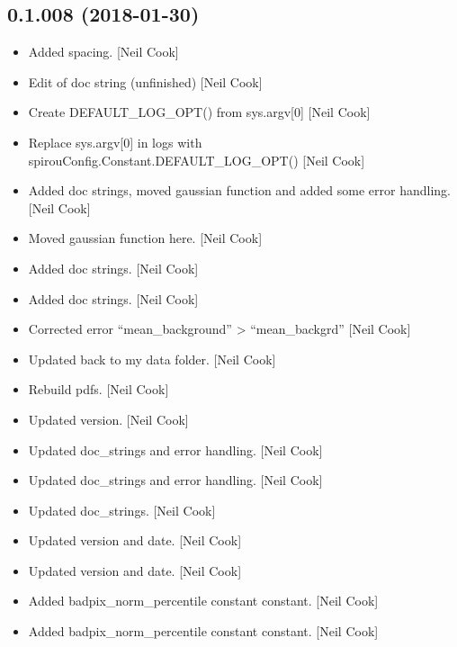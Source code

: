 \documentclass[a4paper,10pt,english]{report}
\begin{document}
\subsection{0.1.008 (2018-01-30)}
\label{\detokenize{misc/changelog:id494}}\begin{itemize}
\item {} 
Added spacing. {[}Neil Cook{]}

\item {} 
Edit of doc string (unfinished) {[}Neil Cook{]}

\item {} 
Create DEFAULT\_LOG\_OPT() from sys.argv{[}0{]} {[}Neil Cook{]}

\item {} 
Replace sys.argv{[}0{]} in logs with
spirouConfig.Constant.DEFAULT\_LOG\_OPT() {[}Neil Cook{]}

\item {} 
Added doc strings, moved gaussian function and added some error
handling. {[}Neil Cook{]}

\item {} 
Moved gaussian function here. {[}Neil Cook{]}

\item {} 
Added doc strings. {[}Neil Cook{]}

\item {} 
Added doc strings. {[}Neil Cook{]}

\item {} 
Corrected error “mean\_background” \textendash{}\textgreater{} “mean\_backgrd” {[}Neil Cook{]}

\item {} 
Updated back to my data folder. {[}Neil Cook{]}

\item {} 
Rebuild pdfs. {[}Neil Cook{]}

\item {} 
Updated version. {[}Neil Cook{]}

\item {} 
Updated doc\_strings and error handling. {[}Neil Cook{]}

\item {} 
Updated doc\_strings and error handling. {[}Neil Cook{]}

\item {} 
Updated doc\_strings. {[}Neil Cook{]}

\item {} 
Updated version and date. {[}Neil Cook{]}

\item {} 
Updated version and date. {[}Neil Cook{]}

\item {} 
Added badpix\_norm\_percentile constant constant. {[}Neil Cook{]}

\item {} 
Added badpix\_norm\_percentile constant constant. {[}Neil Cook{]}

\end{itemize}
\end{document}
